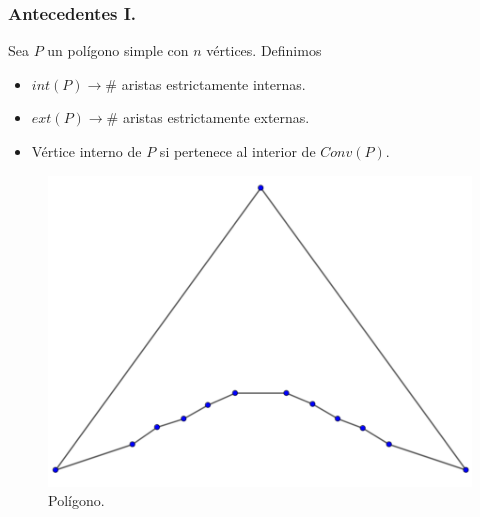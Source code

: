 \begin{frame}
  \frametitle{Antecedentes I.}    
  Sea $P$ un polígono simple con $n$ vértices. Definimos
  \begin{itemize}
  \item $int(P) \rightarrow \#$ aristas estrictamente internas. 
  \item $ext(P) \rightarrow \#$ aristas estrictamente externas.
  \item Vértice interno de $P$ si pertenece al interior de $Conv(P)$.
  \end{itemize}
    \begin{figure}
    \centering
    \includegraphics[width=.30 \paperwidth]{./images/Ejemplo1.png}
    \caption*{Polígono.}
  \end{figure}
\end{frame}


